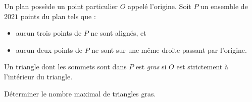 Un plan possède un point particulier $O$ appelé l'origine. Soit $P$ un ensemble de $2021$ points du plan tels que :
\begin{itemize}
\item aucun trois points de $P$ ne sont alignés, et
\item aucun deux points de $P$ ne sont sur une même droite passant par l'origine.
\end{itemize}
Un triangle dont les sommets sont dans $P$ est \emph{gras} si $O$ est strictement à l'intérieur du triangle.

Déterminer le nombre maximal de triangles gras.
